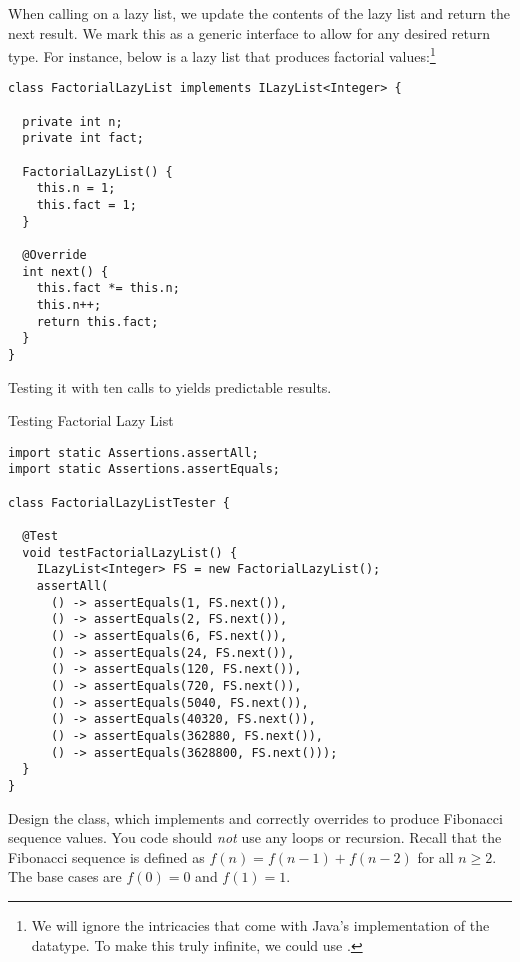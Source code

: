When calling  on a lazy list, we update the contents of the lazy list and return the next result. We mark this as a generic interface to allow for any desired return type. For instance, below is a lazy list that produces factorial values:\footnote{We will ignore the intricacies that come with Java's implementation of the  datatype. To make this truly infinite, we could use .}
\begin{cl}{}
\begin{lstlisting}[language=MyJava]
class FactorialLazyList implements ILazyList<Integer> {

  private int n;
  private int fact;
 
  FactorialLazyList() {
    this.n = 1;
    this.fact = 1;
  }

  @Override
  int next() {
    this.fact *= this.n;
    this.n++;
    return this.fact;
  }
}
\end{lstlisting}
\end{cl}

Testing it with ten calls to  yields predictable results.

\begin{cl}{Testing Factorial Lazy List}
\begin{lstlisting}[language=MyJava]
import static Assertions.assertAll;
import static Assertions.assertEquals;

class FactorialLazyListTester {

  @Test
  void testFactorialLazyList() {
    ILazyList<Integer> FS = new FactorialLazyList();
    assertAll(
      () -> assertEquals(1, FS.next()),
      () -> assertEquals(2, FS.next()),
      () -> assertEquals(6, FS.next()),
      () -> assertEquals(24, FS.next()),
      () -> assertEquals(120, FS.next()),
      () -> assertEquals(720, FS.next()),
      () -> assertEquals(5040, FS.next()),
      () -> assertEquals(40320, FS.next()),
      () -> assertEquals(362880, FS.next()),
      () -> assertEquals(3628800, FS.next()));
  }
}
\end{lstlisting}
\end{cl}

Design the  class, which implements  and correctly overrides  to produce Fibonacci sequence values. You code should \emph{not} use any loops or recursion. Recall that the Fibonacci sequence is defined as $f(n) = f(n - 1) + f(n - 2)$ for all $n\geq{2}$. The base cases are $f(0) = 0$ and $f(1) = 1$.

